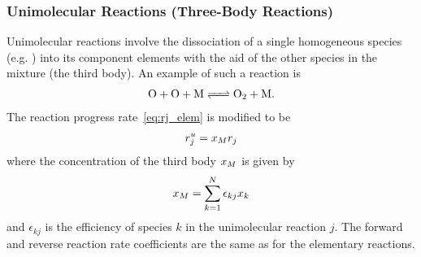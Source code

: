 \subsubsection{Unimolecular Reactions (Three-Body Reactions)}
Unimolecular reactions involve the dissociation of a single 
homogeneous species (e.g. ) into its component elements 
with the aid of the other species in the mixture (the third body). 
An example of such a reaction is 
\begin{align}
  \ce{O + O + M <=> O2 + M}.
\end{align}
The reaction progress rate~\eqref{eq:rj_elem} is modified to be 
\begin{align}
  r_{j}^{u} = x_{M}r_{j}
\end{align} 
where the concentration of the third body $x_{M}$ is given by 
\begin{align}
  x_{M} = \sum_{k=1}^{N}{\epsilon_{kj}x_{k}}
\end{align}
and $\epsilon_{kj}$ is the efficiency of species $k$ in the 
unimolecular reaction $j$.  The forward and reverse reaction 
rate coefficients are the same as for the elementary reactions.

